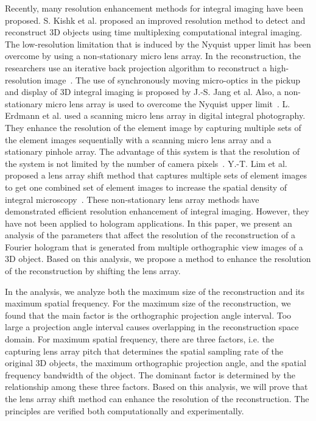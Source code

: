 \documentclass[10pt,letterpaper]{article}
\begin{document}
Recently, many resolution enhancement methods for integral imaging have been proposed. S. Kishk et al. proposed an improved resolution method to detect and reconstruct 3D objects using time multiplexing computational integral imaging. The low-resolution limitation that is induced by the Nyquist upper limit has been overcome by using a non-stationary micro lens array. In the reconstruction, the researchers use an iterative back projection algorithm to reconstruct a high-resolution image~\cite{Kishk_2003_OE}. The use of synchronously moving micro-optics in the pickup and display of 3D integral imaging is proposed by J.-S. Jang et al. Also, a non-stationary micro lens array is used to overcome the Nyquist upper limit~\cite{Jang_2002_OL}. L. Erdmann et al. used a scanning micro lens array in digital integral photography. They enhance the resolution of the element image by capturing multiple sets of the element images sequentially with a scanning micro lens array and a stationary pinhole array. The advantage of this system is that the resolution of the system is not limited by the number of camera pixels~\cite{Erdmann_2001_AO}. Y.-T. Lim et al. proposed a lens array shift method that captures multiple sets of element images to get one combined set of element images to increase the spatial density of integral microscopy~\cite{Lim_2009_OE}. These non-stationary lens array methods have demonstrated efficient resolution enhancement of integral imaging. However, they have not been applied to hologram applications.
In this paper, we present an analysis of the parameters that affect the resolution of the reconstruction of a Fourier hologram that is generated from multiple orthographic view images of a 3D object. Based on this analysis, we propose a method to enhance the resolution of the reconstruction by shifting the lens array. 

In the analysis, we analyze both the maximum size of the reconstruction and its maximum spatial frequency. For the maximum size of the reconstruction, we found that the main factor is the orthographic projection angle interval. Too large a projection angle interval causes overlapping in the reconstruction space domain. For maximum spatial frequency, there are three factors, i.e. the capturing lens array pitch that determines the spatial sampling rate of the original 3D objects, the maximum orthographic projection angle, and the spatial frequency bandwidth of the object. The dominant factor is determined by the relationship among these three factors. Based on this analysis, we will prove that the lens array shift method can enhance the resolution of the reconstruction. The principles are verified both computationally and experimentally.
\end{document}
